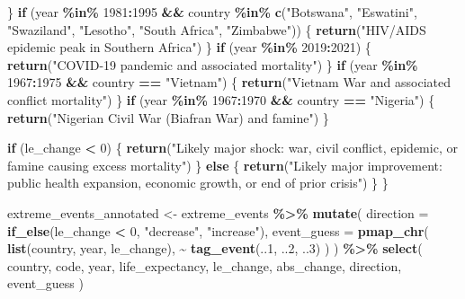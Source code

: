 \documentclass[
  11pt,
]{article}
\newenvironment{Shaded}{\begin{snugshade}}{\end{snugshade}}
\newcommand{\AttributeTok}[1]{\textcolor[rgb]{0.13,0.29,0.53}{#1}}
\newcommand{\ControlFlowTok}[1]{\textcolor[rgb]{0.13,0.29,0.53}{\textbf{#1}}}
\newcommand{\DecValTok}[1]{\textcolor[rgb]{0.00,0.00,0.81}{#1}}
\newcommand{\FunctionTok}[1]{\textcolor[rgb]{0.13,0.29,0.53}{\textbf{#1}}}
\newcommand{\NormalTok}[1]{#1}
\newcommand{\OtherTok}[1]{\textcolor[rgb]{0.56,0.35,0.01}{#1}}
\newcommand{\SpecialCharTok}[1]{\textcolor[rgb]{0.81,0.36,0.00}{\textbf{#1}}}
\newcommand{\StringTok}[1]{\textcolor[rgb]{0.31,0.60,0.02}{#1}}
\begin{document}
\begin{Shaded}
\begin{Highlighting}[]
\NormalTok{  \}}
  \ControlFlowTok{if}\NormalTok{ (year }\SpecialCharTok{\%in\%} \DecValTok{1981}\SpecialCharTok{:}\DecValTok{1995} \SpecialCharTok{\&\&}\NormalTok{ country }\SpecialCharTok{\%in\%} \FunctionTok{c}\NormalTok{(}\StringTok{"Botswana"}\NormalTok{, }\StringTok{"Eswatini"}\NormalTok{, }\StringTok{"Swaziland"}\NormalTok{, }\StringTok{"Lesotho"}\NormalTok{, }\StringTok{"South Africa"}\NormalTok{, }\StringTok{"Zimbabwe"}\NormalTok{)) \{}
    \FunctionTok{return}\NormalTok{(}\StringTok{"HIV/AIDS epidemic peak in Southern Africa"}\NormalTok{)}
\NormalTok{  \}}
  \ControlFlowTok{if}\NormalTok{ (year }\SpecialCharTok{\%in\%} \DecValTok{2019}\SpecialCharTok{:}\DecValTok{2021}\NormalTok{) \{}
    \FunctionTok{return}\NormalTok{(}\StringTok{"COVID{-}19 pandemic and associated mortality"}\NormalTok{)}
\NormalTok{  \}}
  \ControlFlowTok{if}\NormalTok{ (year }\SpecialCharTok{\%in\%} \DecValTok{1967}\SpecialCharTok{:}\DecValTok{1975} \SpecialCharTok{\&\&}\NormalTok{ country }\SpecialCharTok{==} \StringTok{"Vietnam"}\NormalTok{) \{}
    \FunctionTok{return}\NormalTok{(}\StringTok{"Vietnam War and associated conflict mortality"}\NormalTok{)}
\NormalTok{  \}}
  \ControlFlowTok{if}\NormalTok{ (year }\SpecialCharTok{\%in\%} \DecValTok{1967}\SpecialCharTok{:}\DecValTok{1970} \SpecialCharTok{\&\&}\NormalTok{ country }\SpecialCharTok{==} \StringTok{"Nigeria"}\NormalTok{) \{}
    \FunctionTok{return}\NormalTok{(}\StringTok{"Nigerian Civil War (Biafran War) and famine"}\NormalTok{)}
\NormalTok{  \}}

  \ControlFlowTok{if}\NormalTok{ (le\_change }\SpecialCharTok{\textless{}} \DecValTok{0}\NormalTok{) \{}
    \FunctionTok{return}\NormalTok{(}\StringTok{"Likely major shock: war, civil conflict, epidemic, or famine causing excess mortality"}\NormalTok{)}
\NormalTok{  \} }\ControlFlowTok{else}\NormalTok{ \{}
    \FunctionTok{return}\NormalTok{(}\StringTok{"Likely major improvement: public health expansion, economic growth, or end of prior crisis"}\NormalTok{)}
\NormalTok{  \}}
\NormalTok{\}}

\NormalTok{extreme\_events\_annotated }\OtherTok{\textless{}{-}}\NormalTok{ extreme\_events }\SpecialCharTok{\%\textgreater{}\%}
  \FunctionTok{mutate}\NormalTok{(}
    \AttributeTok{direction =} \FunctionTok{if\_else}\NormalTok{(le\_change }\SpecialCharTok{\textless{}} \DecValTok{0}\NormalTok{, }\StringTok{"decrease"}\NormalTok{, }\StringTok{"increase"}\NormalTok{),}
    \AttributeTok{event\_guess =} \FunctionTok{pmap\_chr}\NormalTok{(}
      \FunctionTok{list}\NormalTok{(country, year, le\_change),}
      \SpecialCharTok{\textasciitilde{}} \FunctionTok{tag\_event}\NormalTok{(..}\DecValTok{1}\NormalTok{, ..}\DecValTok{2}\NormalTok{, ..}\DecValTok{3}\NormalTok{)}
\NormalTok{    )}
\NormalTok{  ) }\SpecialCharTok{\%\textgreater{}\%}
  \FunctionTok{select}\NormalTok{(}
\NormalTok{    country,}
\NormalTok{    code,}
\NormalTok{    year,}
\NormalTok{    life\_expectancy,}
\NormalTok{    le\_change,}
\NormalTok{    abs\_change,}
\NormalTok{    direction,}
\NormalTok{    event\_guess}
\NormalTok{  )}
\end{Highlighting}
\end{Shaded}
\end{document}
